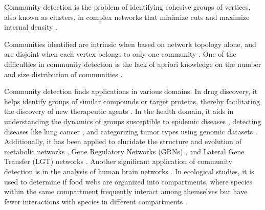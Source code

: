 Community detection is the problem of identifying cohesive groups of vertices, also known as clusters, in complex networks that minimize cuts and maximize internal density \cite{garza2019community}. Communities identified are intrinsic when based on network topology alone, and are disjoint when each vertex belongs to only one community \cite{com-gregory10}. One of the difficulties in community detection is the lack of apriori knowledge on the number and size distribution of communities \cite{com-blondel08}.

Community detection finds applications in various domains. In drug discovery, it helps identify groups of similar compounds or target proteins, thereby facilitating the discovery of new therapeutic agents \cite{ma2019comparative, udrescu2020uncovering}. In the health domain, it aids in understanding the dynamics of groups susceptible to epidemic diseases \cite{salathe2010dynamics}, detecting diseases like lung cancer \cite{bechtel2005lung}, and categorizing tumor types using genomic datasets \cite{haq2016community}. Additionally, it has been applied to elucidate the structure and evolution of metabolic networks \cite{pfeiffer2005evolution, kim2009centralized}, Gene Regulatory Networks (GRNs) \cite{rivera2010nemo}, and Lateral Gene Transfer (LGT) networks \cite{popa2011directed}. Another significant application of community detection is in the analysis of human brain networks \cite{bullmore2009complex, he2010graph}. In ecological studies, it is used to determine if food webs are organized into compartments, where species within the same compartment frequently interact among themselves but have fewer interactions with species in different compartments \cite{krause2003compartments, rezende2009compartments, guimera2010origin}.

